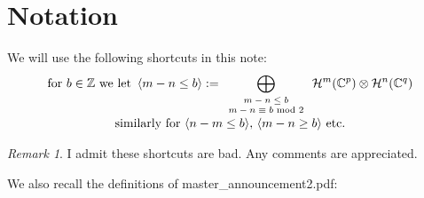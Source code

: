 \documentclass[12pt]{article} %
\theoremstyle{remark}
\newtheorem{remark}{Remark}
\begin{document}
\section{Notation}
We will use the following shortcuts in this note:\begin{equation*}
	\begin{array}[]{c}
		\mbox{for $b\in\Z$ we let }\myabra{m-n\le b}:=\displaystyle\bigoplus_{\scriptsize \begin{array}[]{c}
			m-n\le b\\ m-n\equiv b\mbox{ mod 2}
		\end{array}}\mathcal{H}^m(\C^{p})\otimes \mathcal{H}^n(\C^q)\\
		\mbox{similarly for $\myabra{n-m\le b}$, $\myabra{m-n\ge b}$ etc.}
	\end{array}
\end{equation*}
\begin{remark}
	I admit these shortcuts are bad. Any comments are appreciated.
\end{remark}
We also recall the definitions of {\ttfamily master\_announcement2.pdf}:
\end{document}
